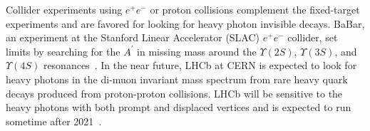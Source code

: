 \indent Collider experiments using $e^+e^-$ or proton collisions complement the fixed-target experiments and are favored for looking for heavy photon invisible decays.  BaBar, an experiment at the Stanford Linear Accelerator (SLAC) $e^+e^-$ collider, set limits by searching for the $A^{\prime}$ in missing mass around the $\Upsilon(2S)$, $\Upsilon(3S)$, and $\Upsilon(4S)$ resonances~\cite{Lees_2014xha}. In the near future, LHCb at CERN is expected to look for heavy photons in the di-muon invariant mass spectrum from rare heavy quark decays produced from proton-proton collisions. LHCb will be sensitive to the heavy photons with both prompt and displaced vertices and is expected to run sometime after 2021~\cite{Ilten_2016tkc}.